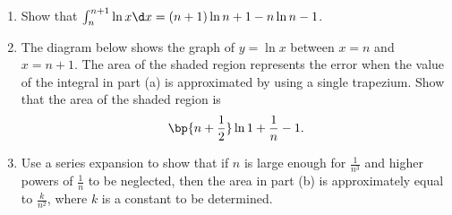 \begin{problem}
    \begin{enumerate}
        \item Show that $\int_n^{n+1} \ln x \d x = (n+1)\ln{n+1} - n\ln n - 1$.
        \item The diagram below shows the graph of $y=\ln x$ between $x=n$ and $x=n+1$. The area of the shaded region represents the error when the value of the integral in part (a) is approximated by using a single trapezium. Show that the area of the shaded region is \[\bp{n + \frac12} \ln{1 + \frac1n} - 1.\]

        \begin{center}
        \end{center}
        \item Use a series expansion to show that if $n$ is large enough for $\frac{1}{n^{3}}$ and higher powers of $\frac{1}{n}$ to be neglected, then the area in part (b) is approximately equal to $\frac{k}{n^2}$, where $k$ is a constant to be determined.
    \end{enumerate}
\end{problem}